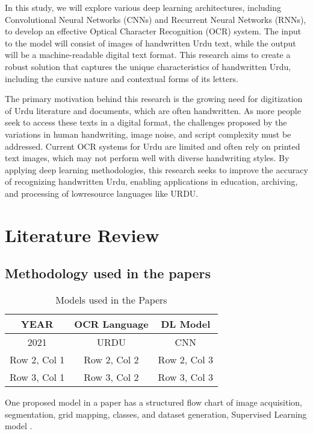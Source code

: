 \documentclass[11pt,twocolumn,twoside]{article} %
\begin{document}
In this study, we will explore various deep learning architectures, including Convolutional Neural Networks (CNNs) and Recurrent Neural Networks (RNNs), to develop an effective Optical Character Recognition (OCR) system. The input to the model will consist of images of handwritten Urdu text, while the output will be a machine-readable digital text format. This research aims to create a robust solution that captures the unique characteristics of handwritten Urdu, including the cursive nature and contextual forms of its letters.

The primary motivation behind this research is the growing need for digitization of Urdu literature and documents, which are often handwritten. As more people seek to access these texts in a digital format, the challenges proposed by the variations in human handwriting, image noise, and script complexity must be addressed. Current OCR systems for Urdu are limited and often rely on printed text images, which may not perform well with diverse handwriting styles.
By applying deep learning methodologies, this research seeks to improve the accuracy of recognizing handwritten Urdu, enabling applications in education, archiving, and processing of lowresource languages like URDU. 

\section{Literature Review}	


\subsection{Methodology used in the papers}
    \renewcommand{\tablename}{Table}
    \begin{table}[ht]
    \centering
    \caption{Models used in the Papers}
    \begin{tabular}{ccc} %
        \toprule
        YEAR & OCR Language & DL Model \\ %
        \midrule
        2021 \cite{mushtaq21} & URDU & CNN \\ %
        Row 2, Col 1 & Row 2, Col 2 & Row 2, Col 3 \\ %
        Row 3, Col 1 & Row 3, Col 2 & Row 3, Col 3 \\ %
        \bottomrule
    \end{tabular}
    \label{}
    \end{table}
    One proposed model in a paper has a structured flow chart of image acquisition, segmentation, grid mapping, classes, and dataset generation, Supervised Learning model \cite{rizvi2018ocr}.
\end{document}
